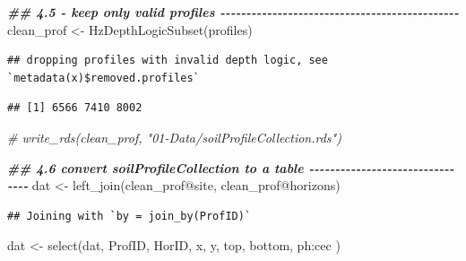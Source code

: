 \documentclass[
  10pt,
  b5paper,
  oneside]{book}
\newenvironment{Shaded}{\begin{snugshade}}{\end{snugshade}}
\newcommand{\CommentTok}[1]{\textcolor[rgb]{0.56,0.35,0.01}{\textit{#1}}}
\newcommand{\DocumentationTok}[1]{\textcolor[rgb]{0.56,0.35,0.01}{\textbf{\textit{#1}}}}
\newcommand{\FunctionTok}[1]{\textcolor[rgb]{0.00,0.00,0.00}{#1}}
\newcommand{\NormalTok}[1]{#1}
\newcommand{\OtherTok}[1]{\textcolor[rgb]{0.56,0.35,0.01}{#1}}
\newcommand{\SpecialCharTok}[1]{\textcolor[rgb]{0.00,0.00,0.00}{#1}}
\begin{document}
\begin{Shaded}
\begin{Highlighting}[]
\DocumentationTok{\#\# 4.5 {-} keep only valid profiles {-}{-}{-}{-}{-}{-}{-}{-}{-}{-}{-}{-}{-}{-}{-}{-}{-}{-}{-}{-}{-}{-}{-}{-}{-}{-}{-}{-}{-}{-}{-}{-}{-}{-}{-}{-}{-}{-}{-}{-}{-}{-}{-}{-}{-}{-}}
\NormalTok{clean\_prof }\OtherTok{\textless{}{-}} \FunctionTok{HzDepthLogicSubset}\NormalTok{(profiles)}
\end{Highlighting}
\end{Shaded}

\begin{verbatim}
## dropping profiles with invalid depth logic, see `metadata(x)$removed.profiles`
\end{verbatim}

\begin{Shaded}
\end{Shaded}

\begin{verbatim}
## [1] 6566 7410 8002
\end{verbatim}

\begin{Shaded}
\begin{Highlighting}[]
\CommentTok{\# write\_rds(clean\_prof, "01{-}Data/soilProfileCollection.rds")}

\DocumentationTok{\#\# 4.6 convert soilProfileCollection to a table {-}{-}{-}{-}{-}{-}{-}{-}{-}{-}{-}{-}{-}{-}{-}{-}{-}{-}{-}{-}{-}{-}{-}{-}{-}{-}{-}{-}{-}{-}{-}{-}}
\NormalTok{dat }\OtherTok{\textless{}{-}} \FunctionTok{left\_join}\NormalTok{(clean\_prof}\SpecialCharTok{@}\NormalTok{site, clean\_prof}\SpecialCharTok{@}\NormalTok{horizons)}
\end{Highlighting}
\end{Shaded}

\begin{verbatim}
## Joining with `by = join_by(ProfID)`
\end{verbatim}

\begin{Shaded}
\begin{Highlighting}[]
\NormalTok{dat }\OtherTok{\textless{}{-}} \FunctionTok{select}\NormalTok{(dat, ProfID, HorID, x, y, top, bottom, ph}\SpecialCharTok{:}\NormalTok{cec )}
\end{Highlighting}
\end{Shaded}
\end{document}
